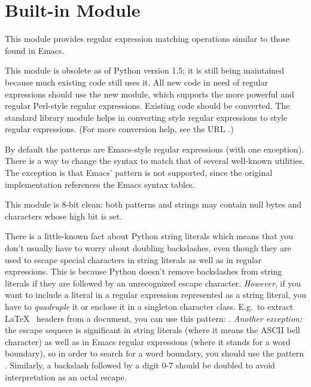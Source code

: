 \section{Built-in Module }
\label{module-regex}

This module provides regular expression matching operations similar to
those found in Emacs.

This module is obsolete as of Python version 1.5; it is still being
maintained because much existing code still uses it.  All new code in
need of regular expressions should use the new  module, which
supports the more powerful and regular Perl-style regular expressions.
Existing code should be converted.  The standard library module
 helps in converting  style regular
expressions to  style regular expressions.  (For more
conversion help, see the URL
.)

By default the patterns are Emacs-style regular expressions
(with one exception).  There is
a way to change the syntax to match that of several well-known
\UNIX{} utilities.  The exception is that Emacs' 
pattern is not supported, since the original implementation references
the Emacs syntax tables.

This module is 8-bit clean: both patterns and strings may contain null
bytes and characters whose high bit is set.

 There is a little-known fact about Python string
literals which means that you don't usually have to worry about
doubling backslashes, even though they are used to escape special
characters in string literals as well as in regular expressions.  This
is because Python doesn't remove backslashes from string literals if
they are followed by an unrecognized escape character.
\emph{However}, if you want to include a literal  in a
regular expression represented as a string literal, you have to
\emph{quadruple} it or enclose it in a singleton character class.
E.g.\  to extract \LaTeX\  headers from a document, you can use this pattern:
.  \emph{Another exception:}
the escape sequece  is significant in string literals
(where it means the ASCII bell character) as well as in Emacs regular
expressions (where it stands for a word boundary), so in order to
search for a word boundary, you should use the pattern .
Similarly, a backslash followed by a digit 0-7 should be doubled to
avoid interpretation as an octal escape.

